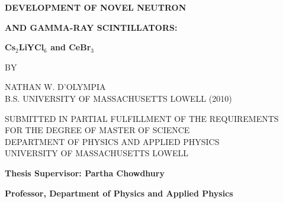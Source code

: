 \begin{center}
\par
\vspace*{0.5in}
{\bf\large DEVELOPMENT OF NOVEL NEUTRON}
\par
\vspace{0.15in}
{\bf\large AND GAMMA-RAY SCINTILLATORS:}
\par
\vspace{0.15in}
{\bf\large Cs$_2$LiYCl$_6$ and CeBr$_3$}
\par
\vspace{0.2in}
{\bf\large }
\par
\vspace{0.6in}
{ BY}
\par
\vspace{0.6in}
{NATHAN W. D'OLYMPIA}\\
{B.S. UNIVERSITY OF MASSACHUSETTS LOWELL (2010)}
\par
\vspace{0.6in}
{SUBMITTED IN PARTIAL FULFILLMENT OF THE REQUIREMENTS}\\
{FOR THE DEGREE OF MASTER OF SCIENCE}\\
{DEPARTMENT OF PHYSICS AND APPLIED PHYSICS}\\
{UNIVERSITY OF MASSACHUSETTS LOWELL}
\end{center}
\par
\vspace{0.6in}
{\bf Thesis Supervisor: Partha Chowdhury}
\par
\vspace{0.1in}
{\bf Professor, Department of Physics and Applied Physics}
\thispagestyle{empty}
